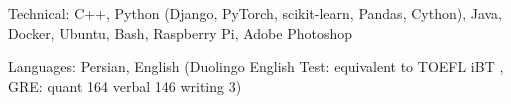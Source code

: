 

\begin{cvskills}

  \cvskill
    {Technical:}
    {C++, Python (Django, PyTorch, scikit-learn, Pandas, Cython), Java, Docker, Ubuntu, Bash, Raspberry Pi, Adobe Photoshop}




  \cvskill
    {Languages:}
    {Persian, English (Duolingo English Test:  equivalent to TOEFL iBT  , GRE: quant 164 verbal 146 writing 3)} %

\end{cvskills}
